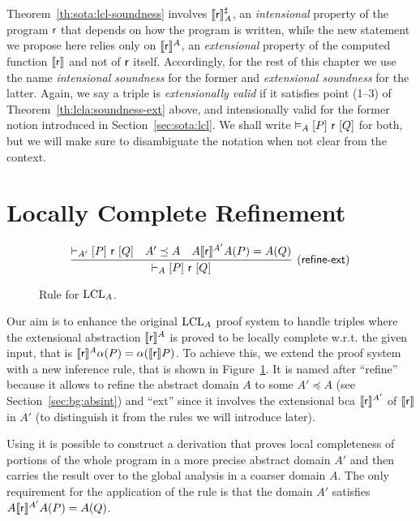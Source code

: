 Theorem~\ref{th:sota:lcl-soundness} involves $\llbracket\mathsf{r}\rrbracket^{\sharp}_A$, an \emph{intensional} property of the program $\mathsf{r}$ that depends on how the program is written, while the new statement we propose here relies only on $\llbracket\mathsf{r}\rrbracket^A$, an \emph{extensional} property of the computed function $\llbracket\mathsf{r}\rrbracket$ and not of $\mathsf{r}$ itself.
Accordingly, for the rest of this chapter we use the name \emph{intensional soundness} for the former and \emph{extensional soundness} for the latter.
Again, we say a triple is \emph{extensionally valid} if it satisfies point (1--3) of Theorem~\ref{th:lcla:soundness-ext} above, and intensionally valid for the former notion introduced in Section~\ref{sec:sota:lcl}. We shall write $\vDash_{A}\nobreak[P]~\mathsf{r}~[Q]$ for both, but we will make sure to disambiguate the notation when not clear from the context.

\section{Locally Complete Refinement}
\begin{figure*}[t]
	\begin{framed}
		\[
		\infer[\lclrule{refine\mbox{-}ext}]
		{\lcl{A}{P}{\regr}{Q}}
		{\lcl{A'}{P}{\regr}{Q} & A' \preceq A & A \denot{\regr}^{A'} A(P) = A(Q)}
		\]
	\end{framed}
	\vspace{-1ex}
	\caption{Rule  for $\text{LCL}_A$.}\label{fig:lcla:rule-refine}
\end{figure*}

Our aim is to enhance the original $\text{LCL}_A$ proof system to handle triples where the extensional abstraction $\llbracket\mathsf{r}\rrbracket^{A}$ is proved to be locally complete w.r.t. the given input, that is $\llbracket\mathsf{r}\rrbracket^{A} \alpha(P) = \alpha(\llbracket\mathsf{r}\rrbracket P)$. To achieve this, we extend the proof system with a new inference rule, that is shown in Figure~\ref{fig:lcla:rule-refine}. It is named after ``refine'' because it allows to refine the abstract domain $A$ to some $A' \preceq A$ (see Section~\ref{sec:bg:absint}) and ``ext'' since it involves the extensional bca $\llbracket\mathsf{r}\rrbracket^{A'}$ of $\llbracket\mathsf{r}\rrbracket$ in $A'$ (to distinguish it from the rules we will introduce later).

Using  it is possible to construct a derivation that proves local completeness of portions of the whole program in a more precise abstract domain $A'$ and then carries the result over to the global analysis in a coarser domain $A$. The only requirement for the application of the rule is that the domain $A'$ satisfies $A \llbracket\mathsf{r}\rrbracket^{A'} A(P) = A(Q)$.


